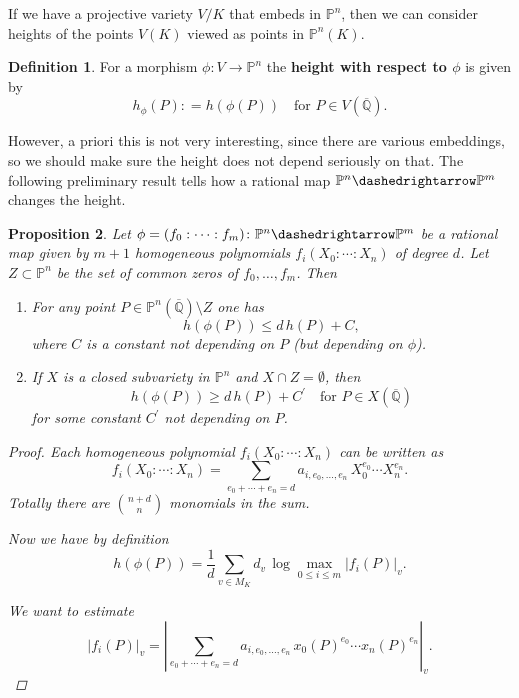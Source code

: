 \documentclass{article}
\newtheorem{proposition}{Proposition}[section]
\theoremstyle{definition}
\newtheorem{definition}[proposition]{Definition}
\newcommand{\term}{\textbf}
\newcommand{\dfn}{\mathrel{\mathop:}=}
\newcommand{\QQ}{\mathbb{Q}}
\newcommand{\PP}{\mathbb{P}}
\begin{document}
If we have a projective variety $V/K$ that embeds in $\PP^n$, then we can
consider heights of the points $V (K)$ viewed as points in $\PP^n (K)$.

\begin{definition}
  For a morphism $\phi\colon V\to \PP^n$ the \term{height with respect to
    $\phi$} is given by
  $$h_\phi (P) \dfn h (\phi (P)) \quad \text{for } P \in V (\overline{\QQ}).$$
\end{definition}

However, a priori this is not very interesting, since there are various
embeddings, so we should make sure the height does not depend seriously on
that. The following preliminary result tells how a rational map
$\PP^n \dashedrightarrow \PP^m$ changes the height.

\begin{proposition}
  \label{proposition:h(phi(P)) = d h(P) + O (1)}
  Let $\phi = (f_0:\cdots:f_m)\colon \PP^n \dashedrightarrow \PP^m$ be a
  rational map given by $m+1$ homogeneous polynomials $f_i (X_0 : \cdots : X_n)$
  of degree $d$. Let $Z \subset \PP^n$ be the set of common zeros of
  $f_0, \ldots, f_m$. Then

  \begin{enumerate}
  \item For any point $P \in \PP^n (\overline{\QQ}) \setminus Z$ one has
    $$h (\phi (P)) \le d \, h (P) + C,$$
    where $C$ is a constant not depending on $P$ (but depending on $\phi$).

  \item If $X$ is a closed subvariety in $\PP^n$ and $X\cap Z = \emptyset$, then
    $$h (\phi (P)) \ge d \, h (P) + C^\prime \quad \text{for }P \in X(\overline{\QQ})$$
    for some constant $C^\prime$ not depending on $P$.
  \end{enumerate}

  \begin{proof}
    Each homogeneous polynomial $f_i (X_0 : \cdots : X_n)$ can be written as
    $$f_i (X_0 : \cdots : X_n) = \sum_{e_0 + \cdots + e_n = d} a_{i,e_0,\ldots,e_n} \, X_0^{e_0}\cdots X_n^{e_n}.$$
    Totally there are ${n + d \choose n}$ monomials in the sum.

    Now we have by definition
    $$h (\phi (P)) = \frac{1}{d} \sum_{v\in M_K} d_v \, \log \max_{0 \le i \le m} |f_i (P)|_v.$$

    We want to estimate
    $$|f_i (P)|_v = \left|\sum_{e_0 + \cdots + e_n = d} a_{i,e_0,\ldots,e_n} \, x_0(P)^{e_0}\cdots x_n(P)^{e_n} \right|_v.$$


\end{proof}
\end{proposition}
\end{document}
